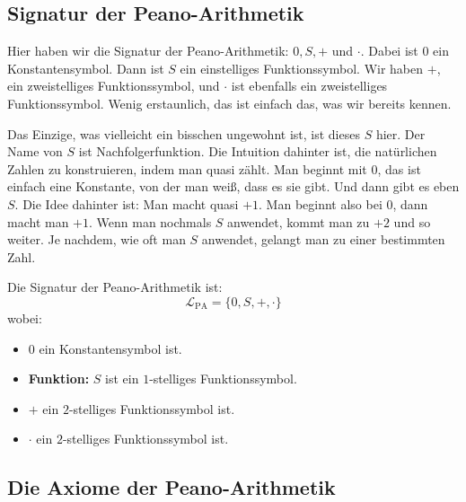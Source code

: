\subsection{Signatur der Peano-Arithmetik}

\begin{spoken-clean}[00:06:29 - 00:07:37]
Hier haben wir die Signatur der Peano-Arithmetik: $0, S, +$ und $\cdot$. Dabei ist $0$ ein Konstantensymbol. Dann ist $S$ ein einstelliges Funktionssymbol. Wir haben $+$, ein zweistelliges Funktionssymbol, und $\cdot$ ist ebenfalls ein zweistelliges Funktionssymbol. Wenig erstaunlich, das ist einfach das, was wir bereits kennen.

Das Einzige, was vielleicht ein bisschen ungewohnt ist, ist dieses $S$ hier. Der Name von $S$ ist Nachfolgerfunktion. Die Intuition dahinter ist, die natürlichen Zahlen zu konstruieren, indem man quasi zählt. Man beginnt mit $0$, das ist einfach eine Konstante, von der man weiß, dass es sie gibt. Und dann gibt es eben $S$. Die Idee dahinter ist: Man macht quasi $+1$. Man beginnt also bei $0$, dann macht man $+1$. Wenn man nochmals $S$ anwendet, kommt man zu $+2$ und so weiter. Je nachdem, wie oft man $S$ anwendet, gelangt man zu einer bestimmten Zahl.
\end{spoken-clean}

\begin{math-stroke}
Die Signatur der Peano-Arithmetik ist:
\[
\mathcal{L}_{\text{PA}} = \{0, S, +, \cdot\}
\]
wobei:
\begin{itemize}
    \item \textbf{$0$} ein Konstantensymbol ist.
    \item \textbf{Funktion:}  $S$ ist ein $1$-stelliges Funktionssymbol.
    \item \textbf{$+$} ein $2$-stelliges Funktionssymbol ist.
    \item \textbf{$\cdot$} ein $2$-stelliges Funktionssymbol ist.
\end{itemize}
\end{math-stroke}

\subsection{Die Axiome der Peano-Arithmetik}

